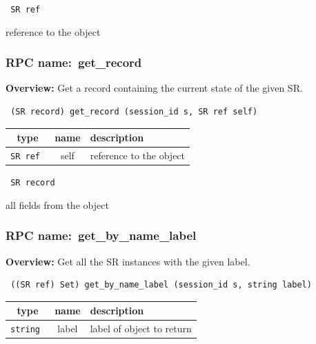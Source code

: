 \vspace{0.3cm}

{\tt 
SR ref
}


reference to the object
\vspace{0.3cm}
\vspace{0.3cm}
\vspace{0.3cm}
\subsubsection{RPC name:~get\_record}

{\bf Overview:} 
Get a record containing the current state of the given SR.

\begin{verbatim} (SR record) get_record (session_id s, SR ref self)\end{verbatim}



 
\vspace{0.3cm}
\begin{tabular}{|c|c|p{7cm}|}
 \hline
{\bf type} & {\bf name} & {\bf description} \\ \hline
{\tt SR ref } & self & reference to the object \\ \hline 

\end{tabular}

\vspace{0.3cm}

{\tt 
SR record
}


all fields from the object
\vspace{0.3cm}
\vspace{0.3cm}
\vspace{0.3cm}
\subsubsection{RPC name:~get\_by\_name\_label}

{\bf Overview:} 
Get all the SR instances with the given label.

\begin{verbatim} ((SR ref) Set) get_by_name_label (session_id s, string label)\end{verbatim}



 
\vspace{0.3cm}
\begin{tabular}{|c|c|p{7cm}|}
 \hline
{\bf type} & {\bf name} & {\bf description} \\ \hline
{\tt string } & label & label of object to return \\ \hline 

\end{tabular}

